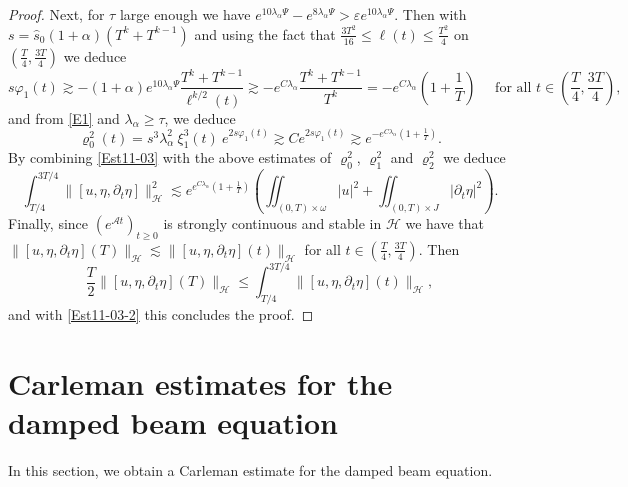 \documentclass[a4paper, 12pt]{article}
\theoremstyle{plain}
\theoremstyle{definition}
\numberwithin{theorem}{section}
\numberwithin{equation}{section}
\begin{document}
{\begin{proof}
Next, for $\tau$ large enough we have $e^{10\lambda_\alpha\Psi}-e^{8\lambda_\alpha\Psi}>\varepsilon e^{10\lambda_\alpha\Psi}$. Then with $s=\widehat{s}_0(1+\alpha)(T^k+T^{k-1})$ and using the fact that $\frac{3 T^2}{16}\leq \ell(t)\leq \frac{T^2}{4} $ on $(\frac{T}{4}, \frac{3T }{4})$ we deduce 
$$
s\varphi_1(t)\gtrsim -(1+\alpha)e^{10\lambda_\alpha\Psi}\frac{T^k+T^{k-1}}{\ell^{k/2}(t)}\gtrsim- e^{C\lambda_\alpha}\frac{T^k+T^{k-1}}{T^k}=-e^{C\lambda_\alpha}\left(1+\frac{1}{T}\right)\quad \mbox{ for all $t\in (\frac{T}{4}, \frac{3T }{4})$,}
$$
and from \eqref{E1} and $\lambda_\alpha\geq \tau$, we deduce
$$
    \varrho_0^2(t)=s^{3} \lambda_\alpha^2~\xi_1^{3}(t)~e^{2s\varphi_1(t)}\gtrsim Ce^{2s\varphi_1(t)}\gtrsim e^{-e^{C\lambda_\alpha}\left(1+\frac{1}{T}\right)}.
$$
By combining \eqref{Est11-03} with the above estimates of $\varrho_0^2$, $\varrho_1^2$ and $\varrho_2^2$ we deduce
\begin{equation}\label{Est11-03-2}
\int_{T/4}^{3T/4}\|[u,\eta,\partial_t\eta]\|^2_{\mathscr{H}}\lesssim e^{e^{C\lambda_\alpha}\left(1+\frac{1}{T}\right)}\left(\iint_{(0,T)\times\omega}|u|^2+ \iint_{(0,T)\times J}|\partial_t\eta|^2\right).
\end{equation}
Finally, since $(e^{\mathcal{A}t})_{t\geq 0}$ is strongly continuous and stable in $\mathscr{H}$ we have that
$\|[u,\eta,\partial_t\eta](T)\|_{\mathscr{H}}\lesssim \|[u,\eta,\partial_t\eta](t)\|_{\mathscr{H}}$ for all $t\in (\frac{T}{4},\frac{3T}{4}).$ 
Then
$$\frac T2 \|[u,\eta,\partial_t\eta](T)\|_{\mathscr{H}} \leq \int_{T/4}^{3T/4}\|[u,\eta,\partial_t\eta](t)\|_{\mathscr{H}},$$ 
and with \eqref{Est11-03-2} this concludes the proof.
\end{proof}


\section{Carleman estimates for the damped beam equation}\label{carleman-poutre}
In this section, we obtain a Carleman estimate for the damped beam equation.

}
\end{document}
